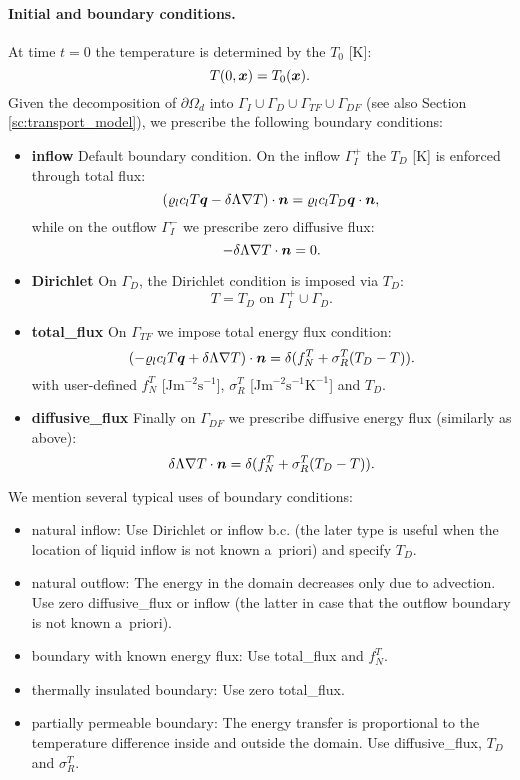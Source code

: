 \paragraph{Initial and boundary conditions.}
At time $t=0$ the temperature is determined by the  $T_0$ [K]:
\[ T(0,\mathbf{\boldsymbol{x}}) = T_0(\mathbf{\boldsymbol{x}}). \]
Given the decomposition of $\partial\Omega_d$ into $\Gamma_I\cup\Gamma_D\cup\Gamma_{TF}\cup\Gamma_{DF}$ (see also Section \ref{sc:transport_model}), we prescribe the following boundary conditions:
\begin{itemize}
\item \textbf{inflow} Default boundary condition. On the inflow $\Gamma_I^+$ the  $T_D$ [K] is enforced through total flux:
\[ \left(\varrho_l c_l T \mathbf{\boldsymbol{q}} - \delta\Lambda\nabla T\right)\cdot\mathbf{\boldsymbol{n}} = \varrho_l c_l T_D\mathbf{\boldsymbol{q}}\cdot\mathbf{\boldsymbol{n}}, \]
while on the outflow $\Gamma_I^-$ we prescribe zero diffusive flux:
\[ -\delta\Lambda\nabla T\cdot\mathbf{\boldsymbol{n}} = 0. \] 
\item \textbf{Dirichlet} On $\Gamma_D$, the Dirichlet condition is imposed via  $T_D$:
\[ T = T_D \mbox{ on }\Gamma_I^+\cup\Gamma_D. \]
\item \textbf{total\_flux}
On $\Gamma_{TF}$ we impose total energy flux condition:
\[ \left(-\varrho_l c_l T \mathbf{\boldsymbol{q}} + \delta\Lambda\nabla T\right)\cdot\mathbf{\boldsymbol{n}} = \delta(f^T_N+\sigma^T_R(T_D-T)). \]
with user-defined  $f^T_N$ [J$\mathrm{m}^{-2}\mathrm{s}^{-1}$],
 $\sigma^T_R$ [J$\mathrm{m}^{-2}\mathrm{s}^{-1}\mathrm{K}^{-1}$] and  $T_D$.
\item \textbf{diffusive\_flux} Finally on $\Gamma_{DF}$ we prescribe diffusive energy flux (similarly as above):
\[ \delta\Lambda\nabla T\cdot\mathbf{\boldsymbol{n}} = \delta(f^T_N+\sigma^T_R(T_D-T)). \]
\end{itemize}
We mention several typical uses of boundary conditions:
\begin{itemize}
\item natural inflow: Use Dirichlet or inflow b.c. (the later type is useful when the location of liquid inflow is not known a~priori) and specify $T_D$.
\item natural outflow: The energy in the domain decreases only due to advection. Use zero diffusive\_flux or inflow (the latter in case that the outflow boundary is not known a~priori).
\item boundary with known energy flux: Use total\_flux and $f_N^T$.
\item thermally insulated boundary: Use zero total\_flux.
\item partially permeable boundary: The energy transfer is proportional to the temperature difference inside and outside the domain.
Use diffusive\_flux, $T_D$ and $\sigma_R^T$.
\end{itemize}






